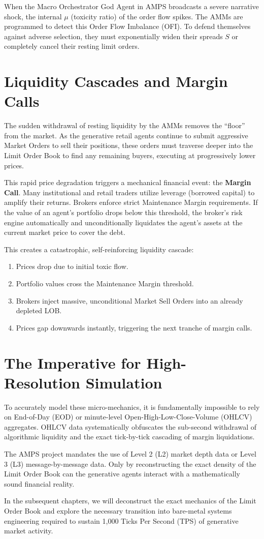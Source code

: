 When the Macro Orchestrator God Agent in AMPS broadcasts a severe narrative shock, the internal $\mu$ (toxicity ratio) of the order flow spikes. The AMMs are programmed to detect this Order Flow Imbalance (OFI). To defend themselves against adverse selection, they must exponentially widen their spreads $S$ or completely cancel their resting limit orders.

\section{Liquidity Cascades and Margin Calls}

The sudden withdrawal of resting liquidity by the AMMs removes the ``floor'' from the market. As the generative retail agents continue to submit aggressive Market Orders to sell their positions, these orders must traverse deeper into the Limit Order Book to find any remaining buyers, executing at progressively lower prices.

This rapid price degradation triggers a mechanical financial event: the \textbf{Margin Call}. Many institutional and retail traders utilize leverage (borrowed capital) to amplify their returns. Brokers enforce strict Maintenance Margin requirements. If the value of an agent's portfolio drops below this threshold, the broker's risk engine automatically and unconditionally liquidates the agent's assets at the current market price to cover the debt.

This creates a catastrophic, self-reinforcing liquidity cascade:
\begin{enumerate}
    \item Prices drop due to initial toxic flow.
    \item Portfolio values cross the Maintenance Margin threshold.
    \item Brokers inject massive, unconditional Market Sell Orders into an already depleted LOB.
    \item Prices gap downwards instantly, triggering the next tranche of margin calls.
\end{enumerate}

\section{The Imperative for High-Resolution Simulation}

To accurately model these micro-mechanics, it is fundamentally impossible to rely on End-of-Day (EOD) or minute-level Open-High-Low-Close-Volume (OHLCV) aggregates. OHLCV data systematically obfuscates the sub-second withdrawal of algorithmic liquidity and the exact tick-by-tick cascading of margin liquidations.

The AMPS project mandates the use of Level 2 (L2) market depth data or Level 3 (L3) message-by-message data. Only by reconstructing the exact density of the Limit Order Book can the generative agents interact with a mathematically sound financial reality. 

In the subsequent chapters, we will deconstruct the exact mechanics of the Limit Order Book and explore the necessary transition into bare-metal systems engineering required to sustain 1,000 Ticks Per Second (TPS) of generative market activity.
